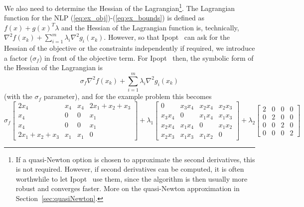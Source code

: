 \documentclass[10pt]{article}
\newcommand{\Ipopt}{{\sc Ipopt }}
\begin{document}
We also need to determine the Hessian of the Lagrangian\footnote{If a
  quasi-Newton option is chosen to approximate the second derivatives,
  this is not required.  However, if second derivatives can be
  computed, it is often worthwhile to let \Ipopt\ use them, since the
  algorithm is then usually more robust and converges faster.  More on
  the quasi-Newton approximation in Section~\ref{sec:quasiNewton}.}.
The Lagrangian function for the NLP
(\ref{eq:ex_obj})-(\ref{eq:ex_bounds}) is defined as $f(x) + g(x)^T
\lambda$ and the Hessian of the Lagrangian function is, technically, $
\nabla^2 f(x_k) + \sum_{i=1}^m\lambda_i\nabla^2 g_i(x_k)$.  However,
so that \Ipopt\ can ask for the Hessian of the objective or the
constraints independently if required, we introduce a factor
($\sigma_f$) in front of the objective term.
%
For \Ipopt\ then, the symbolic form of the Hessian of the
Lagrangian is
\begin{equation}\label{eq:IpoptLAG}
\sigma_f \nabla^2 f(x_k) + \sum_{i=1}^m\lambda_i\nabla^2 g_i(x_k)
\end{equation}
(with the $\sigma_f$ parameter), and for the example problem this becomes
\[%
\sigma_f \left[
\begin{array}{cccc}
2 x_4           & x_4           & x_4           & 2 x_1 + x_2 + x_3     \\
x_4             & 0             & 0             & x_1                   \\
x_4             & 0             & 0             & x_1                   \\
2 x_1+x_2+x_3   & x_1           & x_1           & 0
\end{array}
\right]
+
\lambda_1
\left[
\begin{array}{cccc}
0               & x_3 x_4       & x_2 x_4       & x_2 x_3       \\
x_3 x_4         & 0             & x_1 x_4       & x_1 x_3       \\
x_2 x_4         & x_1 x_4       & 0             & x_1 x_2       \\
x_2 x_3         & x_1 x_3       & x_1 x_2       & 0 
\end{array}
\right]
+
\lambda_2
\left[
\begin{array}{cccc}
2       & 0     & 0     & 0     \\
0       & 2     & 0     & 0     \\
0       & 0     & 2     & 0     \\
0       & 0     & 0     & 2
\end{array}
\right]
\]%
\end{document}
